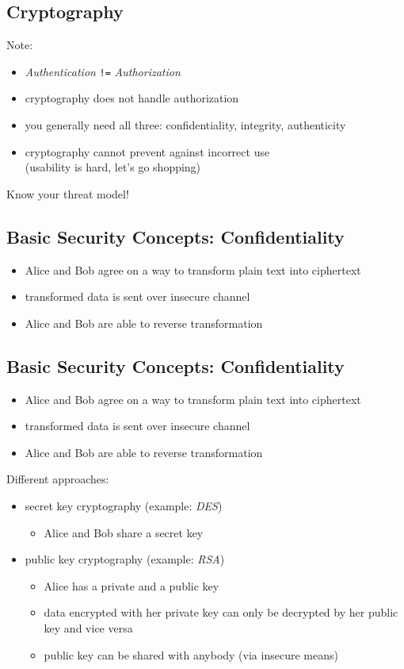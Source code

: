 \documentclass[xga]{xdvislides}
\begin{document}
\subsection{Cryptography}
Note:
\begin{itemize}
	\item {\em Authentication} \verb+!=+ {\em Authorization}
	\item cryptography does not handle authorization
	\item you generally need all three: confidentiality, integrity, authenticity
	\item cryptography cannot prevent against incorrect use \\
		(usability is hard, let's go shopping)
\end{itemize}
\addvspace{.5in}
Know your threat model!

\subsection{Basic Security Concepts: Confidentiality}
\begin{itemize}
	\item Alice and Bob agree on a way to transform plain text into ciphertext
	\item transformed data is sent over insecure channel
	\item Alice and Bob are able to reverse transformation
\end{itemize}

\subsection{Basic Security Concepts: Confidentiality}
\begin{itemize}
	\item Alice and Bob agree on a way to transform plain text into ciphertext
	\item transformed data is sent over insecure channel
	\item Alice and Bob are able to reverse transformation
\end{itemize}
\addvspace{.5in}
Different approaches:
\begin{itemize}
	\item secret key cryptography (example: {\em DES})
		\begin{itemize}
			\item Alice and Bob share a secret key
		\end{itemize}
\end{itemize}
\addvspace{.25in}
\begin{itemize}
	\item public key cryptography (example: {\em RSA})
		\begin{itemize}
			\item Alice has a private and a public key
			\item data encrypted with her private key can only be decrypted by
				her public key and vice versa
			\item public key can be shared with anybody (via insecure means)
		\end{itemize}
\end{itemize}
\end{document}
